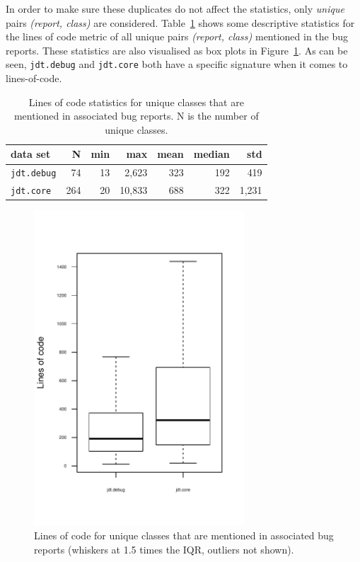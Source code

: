 In order to make sure these duplicates do not affect the statistics, only \emph{unique} pairs \emph{(report, class)} are considered. Table~\ref{tab:loc-stats} shows some descriptive statistics for the lines of code metric of all unique pairs \emph{(report, class)} mentioned in the bug reports. These statistics are also visualised as box plots in Figure~\ref{fig:loc-boxplot}. As can be seen, \texttt{jdt.debug} and \texttt{jdt.core} both have a specific signature when it comes to lines-of-code.

\begin{table}[!ht]\footnotesize
	\centering
	\begin{tabular}{lrrrrrr}
		\toprule
		data set & N & min & max & mean & median & std \\
		\midrule
		\texttt{jdt.debug} & 74 & 13 & 2,623 & 323 & 192 & 419 \\
		\texttt{jdt.core} & 264 & 20 & 10,833 & 688 & 322 & 1,231 \\
		\bottomrule
	\end{tabular} 
	\caption{Lines of code statistics for unique classes that are mentioned in associated bug reports. N is the number of unique classes.}
	\label{tab:loc-stats}
\end{table}

\begin{figure}[!ht]
	\centering
		\includegraphics[width=0.7\textwidth]{img/debug-core-loc-mentioned-boxplot.pdf}
	\caption{Lines of code for unique classes that are mentioned in associated bug reports (whiskers at 1.5 times the IQR, outliers not shown).}
	\label{fig:loc-boxplot}
\end{figure}


